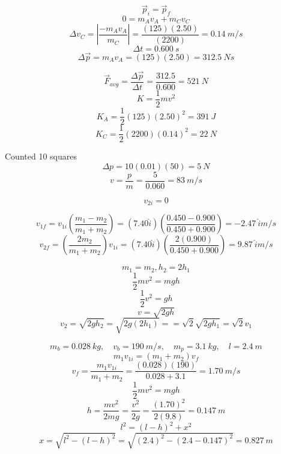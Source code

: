\documentclass[11pt]{homework}
\begin{document}
\setcounter{questionCounter}{20}
\question
\begin{alphaparts}
    \questionpart
    \[
    \vec{p}_i = \vec{p}_f
    \]
    \[
    0 = m_Av_A + m_Cv_C
    \]
    \[
        \Delta v_C = \left|\frac{-m_Av_A}{m_C}\right| =\frac{(125)(2.50)}{(2200)} = \boxed{\qty{0.14}{m /s}}
    \]
    \questionpart
    \[
        \Delta t = \qty{0.600}{s}
    \]
    \[
        \Delta \vec{p} = m_Av_A = (125)(2.50)  = \qty{312.5}{Ns}
    \]
    
    \[
        \vec{F}_{avg} = \frac{\Delta \vec{p}}{\Delta t} = \frac{312.5}{0.600} =  \boxed{\qty{521}{N}}
    \]
    \questionpart
    \[
    K = \frac{1}{2}mv^2 
    \]
    \[
        K_A = \frac{1}{2}(125)(2.50)^2 = \boxed{\qty{391}{J}}
    \]
    \[
        K_C = \frac{1}{2}(2200)(0.14)^2 = \boxed{\qty{22}{N}}
    \]
\end{alphaparts}

\setcounter{questionCounter}{22}
\question
\begin{alphaparts}
    \questionpart
    Counted 10 squares
    \[
        \Delta p = 10(0.01)(50) = \boxed{\qty{5}{N}}
    \]
    \questionpart
    \[
    v = \frac{p}{m} = \frac{5}{0.060} = \boxed{\qty{83}{m /s}}
    \]
\end{alphaparts}

\setcounter{questionCounter}{27}
\question
\[
    v_{2i} = 0
\]

\[
    v_{1f}=v_{1i}\left(\frac{m_{1}-m_{2}}{m_{1}+m_2}\right)=(7.40 \hat{i})\left(\frac{0.450-0.900}{0.450+0.900}\right) = \boxed{\qty{-2.47}{\hat{i} m /s}}
\]
\[
v_{2f}=\left(\frac{2m_{2}}{m_{1}+m_{2}}\right)v_{1i} = (7.40 \hat{i})\left(\frac{2(0.900)}{0.450+0.900}\right) = \boxed{\qty{9.87}{\hat{i} m /s}}
\]



\setcounter{questionCounter}{36}
\question
\[
m_1=m_2, h_2 = 2h_1
\]
\[
\frac{1}{2}mv^2 = mgh
\]
\[
\frac{1}{2}v^2 = gh
\]
\[
v = \sqrt{2gh}
\]
\[
v_2 = \sqrt{2gh_2} = \sqrt{2g(2h_1)} = = \sqrt{2}\sqrt{2gh_1} = \boxed{\sqrt{2}v_1}
\]


\question
\[
m_b = \qty{0.028}{kg}, \quad v_b = \qty{190}{m /s}, \quad m_p = \qty{3.1}{kg}, \quad l = \qty{2.4}{m}
\]
\[
m_{1}v_{1i}=(m_{1}+m_{2})v_{f}
\]
\[
    v_f = \frac{m_1v_{1i}}{m_1+m_2} = \frac{(0.028)(190)}{0.028 + 3.1} = \qty{1.70}{m /s}
\]
\[
\frac{1}{2}mv^2 = mgh
\]
\[
h = \frac{mv^2}{2mg} = \frac{v^2}{2g} = \frac{(1.70)^2}{2(9.8)} = \boxed{\qty{0.147}{m}}
\]
\[
l^2 =(l-h)^2 + x^2
\]
\[
x = \sqrt{l^2 - (l-h)^2} = \sqrt{(2.4)^2 -(2.4-0.147)^2} = \boxed{\qty{0.827}{m}}
\]
\end{document}
